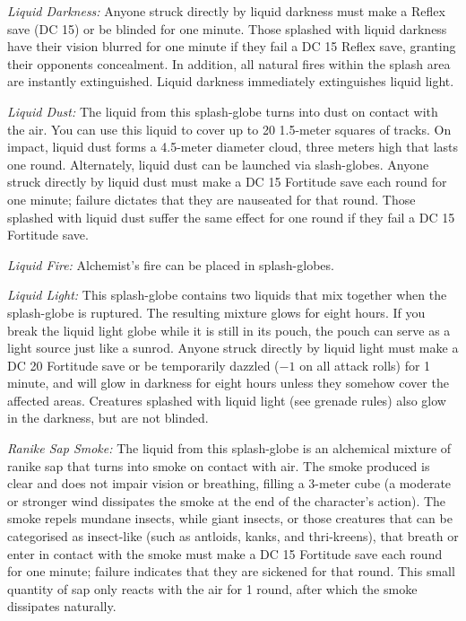  \textit{Liquid Darkness:} Anyone struck directly by liquid darkness must make a Reflex save (DC 15) or be blinded for one minute. Those splashed with liquid darkness have their vision blurred for one minute if they fail a DC 15 Reflex save, granting their opponents concealment. In addition, all natural fires within the splash area are instantly extinguished. Liquid darkness immediately extinguishes liquid light.

 \textit{Liquid Dust:} The liquid from this splash-globe turns into dust on contact with the air. You can use this liquid to cover up to 20 1.5-meter squares of tracks. On impact, liquid dust forms a 4.5-meter diameter cloud, three meters high that lasts one round. Alternately, liquid dust can be launched via slash-globes. Anyone struck directly by liquid dust must make a DC 15 Fortitude save each round for one minute; failure dictates that they are nauseated for that round. Those splashed with liquid dust suffer the same effect for one round if they fail a DC 15 Fortitude save.

 \textit{Liquid Fire:} Alchemist's fire can be placed in splash-globes.

 \textit{Liquid Light:} This splash-globe contains two liquids that mix together when the splash-globe is ruptured. The resulting mixture glows for eight hours. If you break the liquid light globe while it is still in its pouch, the pouch can serve as a light source just like a sunrod. Anyone struck directly by liquid light must make a DC 20 Fortitude save or be temporarily dazzled ($-1$ on all attack rolls) for 1 minute, and will glow in darkness for eight hours unless they somehow cover the affected areas. Creatures splashed with liquid light (see grenade rules) also glow in the darkness, but are not blinded.

 \textit{Ranike Sap Smoke:} The liquid from this splash-globe is an alchemical mixture of ranike sap that turns into smoke on contact with air. The smoke produced is clear and does not impair vision or breathing, filling a 3-meter cube (a moderate or stronger wind dissipates the smoke at the end of the character's action). The smoke repels mundane insects, while giant insects, or those creatures that can be categorised as insect-like (such as antloids, kanks, and thri-kreens), that breath or enter in contact with the smoke must make a DC 15 Fortitude save each round for one minute; failure indicates that they are sickened for that round. This small quantity of sap only reacts with the air for 1 round, after which the smoke dissipates naturally.

